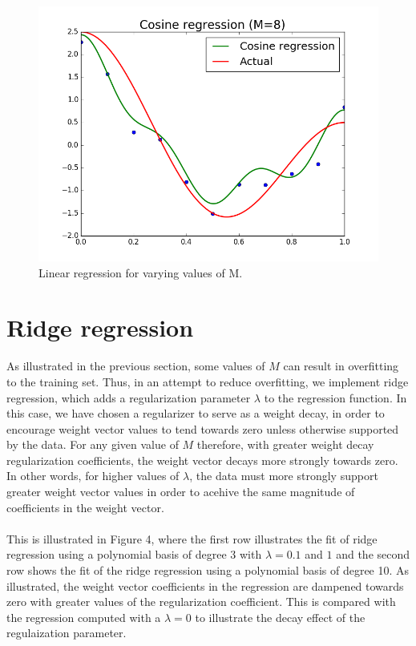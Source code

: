 \documentclass{article}
\begin{document}
\begin{figure}[width=\linewidth]
\begin{multicols}{2}
  \includegraphics[width=1.2\linewidth]{code/P2/cosine_regression,8.png}
\end{multicols}
\caption{Linear regression for varying values of M.}
\end{figure}


\section{Ridge regression}
As illustrated in the previous section, some values of $M$ can result in overfitting to the training set. Thus, in an attempt to reduce overfitting, we implement ridge regression, which adds a regularization parameter $\lambda$ to the regression function. In this case, we have chosen a regularizer to serve as a weight decay, in order to encourage weight vector values to tend towards zero unless otherwise supported by the data. For any given value of $M$ therefore, with greater weight decay regularization coefficients, the weight vector decays more strongly towards zero. In other words, for higher values of $\lambda$, the data must more strongly support greater weight vector values in order to acehive the same magnitude of coefficients in the weight vector. \\ \\
This is illustrated in Figure 4, where the first row illustrates the fit of ridge regression using a polynomial basis of degree 3 with $\lambda = 0.1$ and $1$ and the second row shows the fit of the ridge regression using a polynomial basis of degree 10. As illustrated, the weight vector coefficients in the regression are dampened towards zero with greater values of the regularization coefficient. This is compared with the regression computed with a $\lambda = 0$ to illustrate the decay effect of the regulaization parameter.
\end{document}
